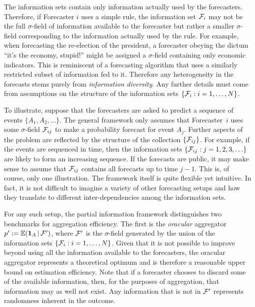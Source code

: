 \documentclass[11pt]{article}
\newcommand{\E}{\mathbb{E}}
\theoremstyle{definition}
\theoremstyle{definition}
\def\one{{\bf 1}}
\def\F{{\cal F}}
\def\E{{\mathbb E}}
\def\|{\, | \,}
\begin{document}
The information sets contain only information actually used by the
forecasters. Therefore, if Forecaster $i$ uses a simple rule, the
information set $\F_i$ may not be the full $\sigma$-field of
information available to the forecaster but rather a smaller
$\sigma$-field corresponding to the information actually used by the
rule.  For example, when forecasting the re-election of the president,  a forecaster obeying the dictum ``it's the economy,
stupid!''  might be assigned a $\sigma$-field containing only economic
indicators.  This is reminiscent of a forecasting algorithm that uses
a similarly restricted subset of information fed to it. Therefore
any heterogeneity in the forecasts stems purely from
\textit{information diversity}.  Any further details must come from
assumptions on the structure of the information sets $\{ \F_i : i = 1,
\dots, N\}$.  %

To illustrate, suppose that the forecasters are asked to predict a sequence of events
$\{ A_1, A_2 , \ldots \}$. The general framework only assumes that
Forecaster~$i$ uses some $\sigma$-field $\F_{ij}$ to make a
probability forecast for event $A_j$.  Further aspects of the problem
are reflected by the structure of the collection $\{ \F_{ij} \}$.  For
example, if the events are sequenced in time, then the information
sets $\{ \F_{ij} : j = 1 , 2, 3, \ldots \}$ are likely to form an
increasing sequence.  If the forecasts are public, it may make sense
to assume that $\F_{ij}$ contains all forecasts up to time $j-1$.
This is, of course, only one illustration. The framework itself is quite flexible
yet intuitive. In fact, it is not difficult to imagine a variety
of other forecasting setups and how they translate to
different inter-dependencies among the information sets.


For any such setup, the partial information framework distinguishes two benchmarks for aggregation efficiency.  The first is the {\em oracular} aggregator
$p' := \E (\one_A \| \F')$, where $\F'$ is the $\sigma$-field
generated by the union of the information sets $\{ \F_i : i = 1, \dots,
N\}$. Given that it is not possible to improve beyond using all the information available
to the forecasters, the oracular aggregator represents a theoretical optimum and is therefore a
reasonable upper bound on estimation efficiency. Note that if a forecaster chooses to discard
some of the available information, then, for the purposes of aggregation,
that information may as well not exist. Any
information that is not in $\F'$ represents randomness inherent in the
outcome.
\end{document}

